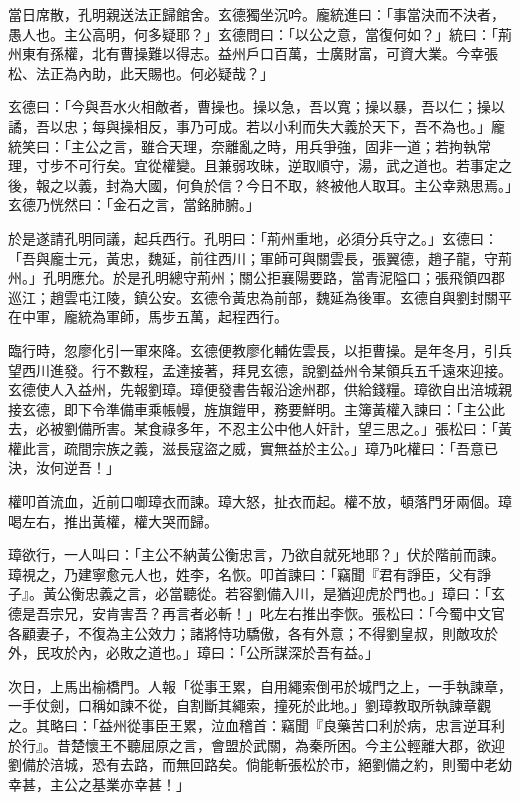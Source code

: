 當日席散，孔明親送法正歸館舍。玄德獨坐沉吟。龐統進曰：「事當決而不決者，愚人也。主公高明，何多疑耶？」玄德問曰：「以公之意，當復何如？」統曰：「荊州東有孫權，北有曹操難以得志。益州戶口百萬，士廣財富，可資大業。今幸張松、法正為內助，此天賜也。何必疑哉？」

玄德曰：「今與吾水火相敵者，曹操也。操以急，吾以寬；操以暴，吾以仁；操以譎，吾以忠；每與操相反，事乃可成。若以小利而失大義於天下，吾不為也。」龐統笑曰：「主公之言，雖合天理，奈離亂之時，用兵爭強，固非一道；若拘執常理，寸步不可行矣。宜從權變。且兼弱攻昧，逆取順守，湯，武之道也。若事定之後，報之以義，封為大國，何負於信？今日不取，終被他人取耳。主公幸熟思焉。」玄德乃恍然曰：「金石之言，當銘肺腑。」

於是遂請孔明同議，起兵西行。孔明曰：「荊州重地，必須分兵守之。」玄德曰：「吾與龐士元，黃忠，魏延，前往西川；軍師可與關雲長，張翼德，趙子龍，守荊州。」孔明應允。於是孔明總守荊州；關公拒襄陽要路，當青泥隘口；張飛領四郡巡江；趙雲屯江陵，鎮公安。玄德令黃忠為前部，魏延為後軍。玄德自與劉封關平在中軍，龐統為軍師，馬步五萬，起程西行。

臨行時，忽廖化引一軍來降。玄德便教廖化輔佐雲長，以拒曹操。是年冬月，引兵望西川進發。行不數程，孟達接著，拜見玄德，說劉益州令某領兵五千遠來迎接。玄德使人入益州，先報劉璋。璋便發書告報沿途州郡，供給錢糧。璋欲自出涪城親接玄德，即下令準備車乘帳幔，旌旗鎧甲，務要鮮明。主簿黃權入諫曰：「主公此去，必被劉備所害。某食祿多年，不忍主公中他人奸計，望三思之。」張松曰：「黃權此言，疏間宗族之義，滋長寇盜之威，實無益於主公。」璋乃叱權曰：「吾意已決，汝何逆吾！」

權叩首流血，近前口啣璋衣而諫。璋大怒，扯衣而起。權不放，頓落門牙兩個。璋喝左右，推出黃權，權大哭而歸。

璋欲行，一人叫曰：「主公不納黃公衡忠言，乃欲自就死地耶？」伏於階前而諫。璋視之，乃建寧愈元人也，姓李，名恢。叩首諫曰：「竊聞『君有諍臣，父有諍子』。黃公衡忠義之言，必當聽從。若容劉備入川，是猶迎虎於門也。」璋曰：「玄德是吾宗兄，安肯害吾？再言者必斬！」叱左右推出李恢。張松曰：「今蜀中文官各顧妻子，不復為主公效力；諸將恃功驕傲，各有外意；不得劉皇叔，則敵攻於外，民攻於內，必敗之道也。」璋曰：「公所謀深於吾有益。」

次日，上馬出榆橋門。人報「從事王累，自用繩索倒弔於城門之上，一手執諫章，一手仗劍，口稱如諫不從，自割斷其繩索，撞死於此地。」劉璋教取所執諫章觀之。其略曰：「益州從事臣王累，泣血稽首：竊聞『良藥苦口利於病，忠言逆耳利於行』。昔楚懷王不聽屈原之言，會盟於武關，為秦所困。今主公輕離大郡，欲迎劉備於涪城，恐有去路，而無回路矣。倘能斬張松於市，絕劉備之約，則蜀中老幼幸甚，主公之基業亦幸甚！」

